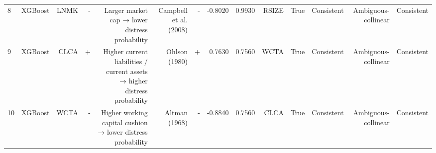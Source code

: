 \begin{table}[htbp]
\begin{tabular}{lrrrrrrrrrrrrr}
8 & XGBoost & LNMK & - & Larger market cap → lower distress probability & Campbell et al. (2008) & - & -0.8020 & 0.9930 & RSIZE & True & Consistent & Ambiguous-collinear & Consistent \\
9 & XGBoost & CLCA & + & Higher current liabilities / current assets → higher distress probability & Ohlson (1980) & + & 0.7630 & 0.7560 & WCTA & True & Consistent & Ambiguous-collinear & Consistent \\
10 & XGBoost & WCTA & - & Higher working capital cushion → lower distress probability & Altman (1968) & - & -0.8840 & 0.7560 & CLCA & True & Consistent & Ambiguous-collinear & Consistent \\
\bottomrule
\end{tabular}
\end{table}
